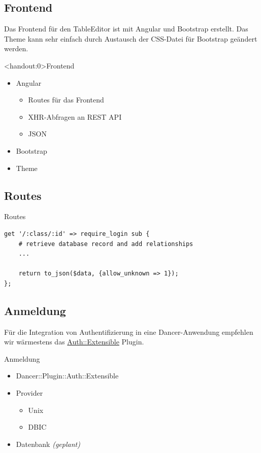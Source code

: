 \subsection{Frontend}
Das Frontend für den TableEditor ist mit Angular und Bootstrap erstellt.
Das Theme kann sehr einfach durch Austausch der CSS-Datei für Bootstrap
geändert werden.

\begin{frame}<handout:0>{Frontend}
\begin{itemize}
\item Angular
\begin{itemize}
\item Routes für das Frontend
\item XHR-Abfragen an REST API
\item JSON
\end{itemize}
\item Bootstrap
\item Theme
\end{itemize}
\end{frame}

\subsection{Routes}
\begin{frame}[fragile]{Routes}
\begin{lstlisting}
get '/:class/:id' => require_login sub {
    # retrieve database record and add relationships
    ...

    return to_json($data, {allow_unknown => 1});
};
\end{lstlisting}
\end{frame}

\subsection{Anmeldung}

Für die Integration von Authentifizierung in eine Dancer-Anwendung empfehlen
wir wärmestens das
\href{https://metacpan.org/pod/Dancer::Plugin::Auth::Extensible}{Auth::Extensible}
Plugin.

\begin{frame}{Anmeldung}
\begin{itemize}
\item Dancer::Plugin::Auth::Extensible
\item Provider
\begin{itemize}
\item Unix
\item DBIC
\end{itemize}
\item Datenbank \textit{(geplant)}
\end{itemize}
\end{frame}

